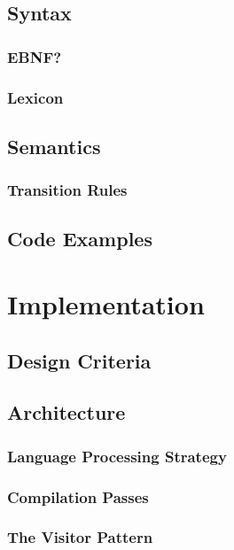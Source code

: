\section{Syntax}
\subsection{EBNF?}
\subsection{Lexicon}
\section{Semantics}
\subsection{Transition Rules}

\section{Code Examples}

\renewcommand{\ind}[1]{}
\chapter{Implementation}
\section{Design Criteria}
\section{Architecture}	
\ind{Hardware}
\ind{OverviewCompiler}
\subsection{Language Processing Strategy}
\subsection{Compilation Passes}
\ind{AbstractSyntaxTrees}
\subsection{The Visitor Pattern}
